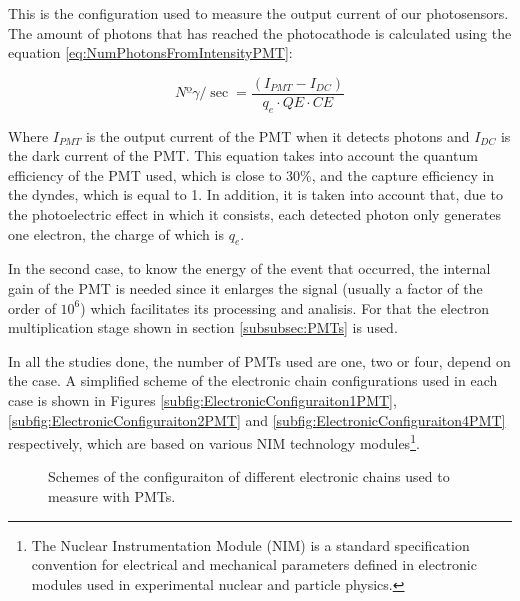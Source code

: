 This is the configuration used to measure the output current of our photosensors. The amount of photons that has reached the photocathode is calculated using the equation \ref{eq:NumPhotonsFromIntensityPMT}:

\begin{equation}
Nº\gamma/\sec = \frac{\left( I_{PMT} - I_{DC} \right)}{q_e \cdot{} QE \cdot{} CE}
\label{eq:NumPhotonsFromIntensityPMT}
\end{equation}

Where $I_{PMT}$ is the output current of the PMT when it detects photons and $I_{DC}$ is the dark current of the PMT. This equation takes into account the quantum efficiency of the PMT used, which is close to $30\%$, and the capture efficiency in the dyndes, which is equal to 1. In addition, it is taken into account that, due to the photoelectric effect in which it consists, each detected photon only generates one electron, the charge of which is $q_e$.

In the second case, to know the energy of the event that occurred, the internal gain of the PMT is needed since it enlarges the signal (usually a factor of the order of $10^6$) which facilitates its processing and analisis. For that the electron multiplication stage shown in section \ref{subsubsec:PMTs} is used.

In all the studies done, the number of PMTs used are one, two or four, depend on the case. A simplified scheme of the electronic chain configurations used in each case is shown in Figures \ref{subfig:ElectronicConfiguraiton1PMT}, \ref{subfig:ElectronicConfiguraiton2PMT} and \ref{subfig:ElectronicConfiguraiton4PMT} respectively, which are based on various NIM technology modules\footnote{The Nuclear Instrumentation Module (NIM) is a standard specification convention for electrical and mechanical parameters defined in electronic modules used in experimental nuclear and particle physics.}.

\begin{figure}[htbp]
 \centering
    \newline  
    \newline
 \caption{Schemes of the configuraiton of different electronic chains used to measure with PMTs.}
 \label{fig:ElectronicConfiguraitonsPMT}
\end{figure}

